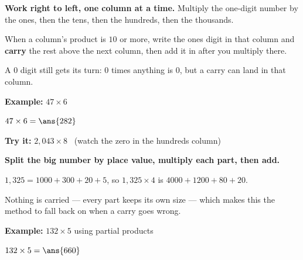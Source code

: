 \documentclass[12pt]{article}
\begin{document}


\begin{formulabox}
\textbf{Work right to left, one column at a time.} Multiply the one-digit number by the ones, then
the tens, then the hundreds, then the thousands.\par
When a column's product is $10$ or more, write the ones digit in that column and \textbf{carry} the
rest above the next column, then add it in after you multiply there.\par
A $0$ digit still gets its turn: $0$ times anything is $0$, but a carry can land in that column.
\end{formulabox}

\begin{examplebox}
\textbf{Example:} \quad $47 \times 6$

$47 \times 6 = \ans{282}$
\end{examplebox}

\begin{tryitbox}
\textbf{Try it:} \quad $2{,}043 \times 8$ \ (watch the zero in the hundreds column)\\[2pt]
\end{tryitbox}


\begin{formulabox}
\textbf{Split the big number by place value, multiply each part, then add.}\par
$1{,}325 = 1000 + 300 + 20 + 5$, so $1{,}325 \times 4$ is
$4000 + 1200 + 80 + 20$.\par
Nothing is carried --- every part keeps its own size --- which makes this the method to fall back on
when a carry goes wrong.
\end{formulabox}

\begin{examplebox}
\textbf{Example:} \quad $132 \times 5$ using partial products

$132 \times 5 = \ans{660}$
\end{examplebox}
\end{document}
